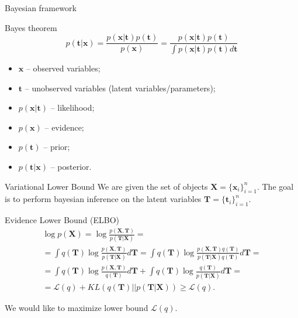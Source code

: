\documentclass{beamer}
\newcommand{\bt}{\mathbf{t}}
\newcommand{\bx}{\mathbf{x}}
\newcommand{\bT}{\mathbf{T}}
\newcommand{\bX}{\mathbf{X}}
\begin{document}
\begin{frame}{Bayesian framework}
    \begin{block}{Bayes theorem}
    \[
        p(\bt | \bx) = \frac{p(\bx | \bt) p(\bt)}{p(\bx)} = \frac{p(\bx | \bt) p(\bt)}{\int p(\bx | \bt) p(\bt) d \bt} 
    \]
    \begin{itemize}
        \item $\bx$ -- observed variables;
        \item $\bt$ -- unobserved variables (latent variables/parameters);
        \item $p(\bx | \bt)$ -- likelihood;
        \item $p(\bx)$ -- evidence;
        \item $p(\bt)$ -- prior;
        \item $p(\bt | \bx)$ -- posterior.
    \end{itemize}
    \end{block}
\end{frame}
\begin{frame}{Variational Lower Bound}
    We are given the set of objects $\bX = \{\bx_i\}_{i=1}^n$. 
    The goal is to perform bayesian inference on the latent variables $\bT = \{\bt_i\}_{i=1}^n$.
    \begin{block}{Evidence Lower Bound (ELBO)}
    \vspace{-0.3cm}
        \begin{multline*}
    		\log p(\bX) 
    		= \log \frac{p(\bX, \bT)}{p(\bT|\bX)} = \\ 
    		= \int q(\bT) \log \frac{p(\bX, \bT)}{p(\bT|\bX)}d\bT
    		= \int q(\bT) \log \frac{p(\bX, \bT) q(\bT)}{p(\bT|\bX) q(\bT)} d\bT = \\
    		= \int q(\bT) \log \frac{p(\bX, \bT)}{q(\bT)}d\bT + \int q(\bT) \log \frac{q(\bT)}{p(\bT|\bX)}d\bT = \\ 
    		= \mathcal{L} (q) + KL(q(\bT) || p(\bT|\bX)) \geq \mathcal{L} (q).
    	\end{multline*}
        \vspace{-0.3cm}
    \end{block}
	We would like to maximize lower bound $\mathcal{L}(q)$.
\end{frame}
\end{document}
